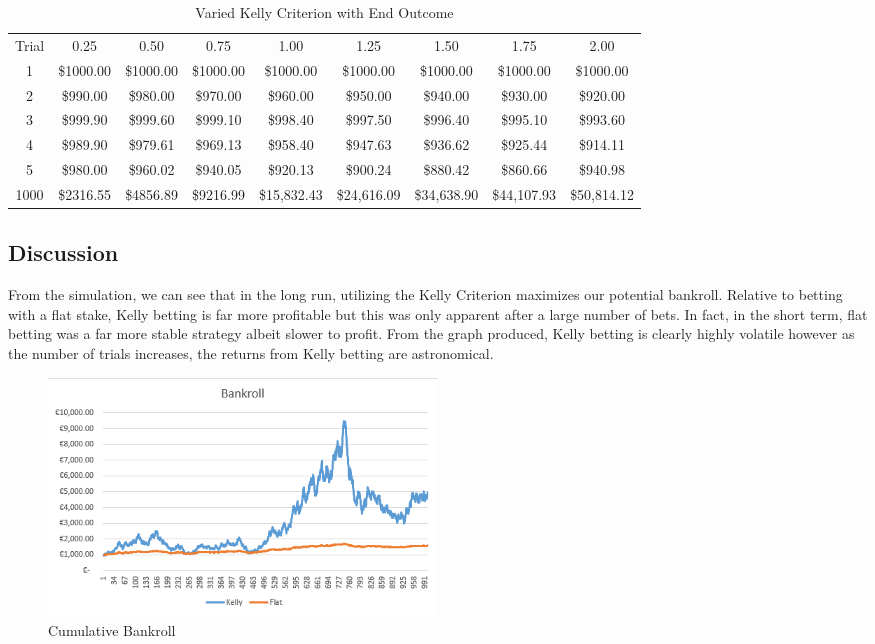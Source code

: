 \documentclass[12pt]{article}
\begin{document}
\begin{table}[H]
\centering
\begin{tabular}{ccccccccc}
Trial & 0.25      & 0.50      & 0.75      & 1.00        & 1.25        & 1.50        & 1.75        & 2.00        \\
1     & \$1000.00 & \$1000.00 & \$1000.00 & \$1000.00   & \$1000.00   & \$1000.00   & \$1000.00   & \$1000.00   \\
2     & \$990.00  & \$980.00  & \$970.00  & \$960.00    & \$950.00    & \$940.00    & \$930.00    & \$920.00    \\
3     & \$999.90  & \$999.60  & \$999.10  & \$998.40    & \$997.50    & \$996.40    & \$995.10    & \$993.60    \\
4     & \$989.90  & \$979.61  & \$969.13  & \$958.40    & \$947.63    & \$936.62    & \$925.44    & \$914.11    \\
5     & \$980.00  & \$960.02  & \$940.05  & \$920.13    & \$900.24    & \$880.42    & \$860.66    & \$940.98    \\
1000  & \$2316.55 & \$4856.89 & \$9216.99 & \$15,832.43 & \$24,616.09 & \$34,638.90 & \$44,107.93 & \$50,814.12
\end{tabular}
\caption{Varied Kelly Criterion with End Outcome}
\end{table}

\subsection{Discussion}
From the simulation, we can see that in the long run, utilizing the Kelly Criterion maximizes our potential bankroll. Relative to betting with a flat stake, Kelly betting is far more profitable but this was only apparent after a large number of bets. In fact, in the short term, flat betting was a far more stable strategy albeit slower to profit. From the graph produced, Kelly betting is clearly highly volatile however as the number of trials increases, the returns from Kelly betting are astronomical.

\begin{figure}[H]
\centering
\includegraphics[width=0.5\textwidth]{kelly_flat.PNG}
\caption{Cumulative Bankroll}
\end{figure}
\end{document}
